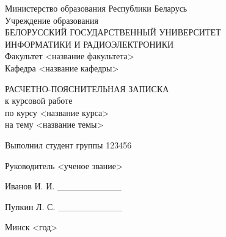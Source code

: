 \setlength{\parindent}{0ex} %


\begin{center}
  Министерство образования Республики Беларусь \\
  \smallskip
  Учреждение образования \\
  БЕЛОРУССКИЙ ГОСУДАРСТВЕННЫЙ УНИВЕРСИТЕТ \\
  ИНФОРМАТИКИ И РАДИОЭЛЕКТРОНИКИ \\
  \smallskip
  Факультет <название факультета> \\
  \smallskip
  Кафедра <название кафедры>
\end{center}

\vspace{60mm}

\begin{center}
  РАСЧЕТНО-ПОЯСНИТЕЛЬНАЯ ЗАПИСКА \\
  к курсовой работе \\
  по курсу <название курса> \\
  на тему <название темы> \\
\end{center}

\vspace{30mm}

\begin{minipage}{.55\linewidth}
    Выполнил студент группы 123456 

    \smallskip

    Руководитель <ученое звание>
\end{minipage}
\hfill
\begin{minipage}{.4\linewidth}
  \begin{flushright}
    Иванов И. И. \_\_\_\_\_\_\_\_\_\_

    \smallskip

    Пупкин Л. С. \_\_\_\_\_\_\_\_\_\_
  \end{flushright}
\end{minipage}

\vspace{70mm}
\begin{center}
  Минск <год>
\end{center}

\setlength{\parindent}{5ex} %
